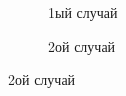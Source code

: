 \begin{figure}[H]
  \centering
  
  \begin{subfigure}[b]{0.4\textwidth}

    \centering
    
    \caption{1ый случай}

  \end{subfigure}
  \qquad
  \begin{subfigure}[b]{0.4\textwidth}

    \centering
    
    \caption{2ой случай}

  \end{subfigure}
\end{figure}